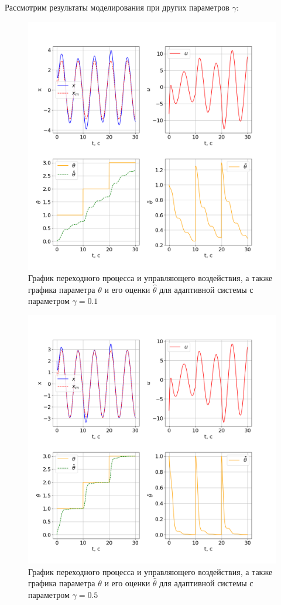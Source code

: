 Рассмотрим результаты моделирования при других параметров $\gamma$:

\begin{figure}
    \centerline{\includegraphics[width=\linewidth]{images/task_2_0.1.png}}
    \caption{График переходного процесса и управляющего воздействия, а также графика параметра $\theta$ и его оценки $\hat{\theta}$ для адаптивной системы с параметром $\gamma = 0.1$}
    \label{22}
\end{figure}

\begin{figure}
    \centerline{\includegraphics[width=\linewidth]{images/task_2_0.5.png}}
    \caption{График переходного процесса и управляющего воздействия, а также графика параметра $\theta$ и его оценки $\hat{\theta}$ для адаптивной системы с параметром $\gamma = 0.5$}
    \label{23}
\end{figure}

